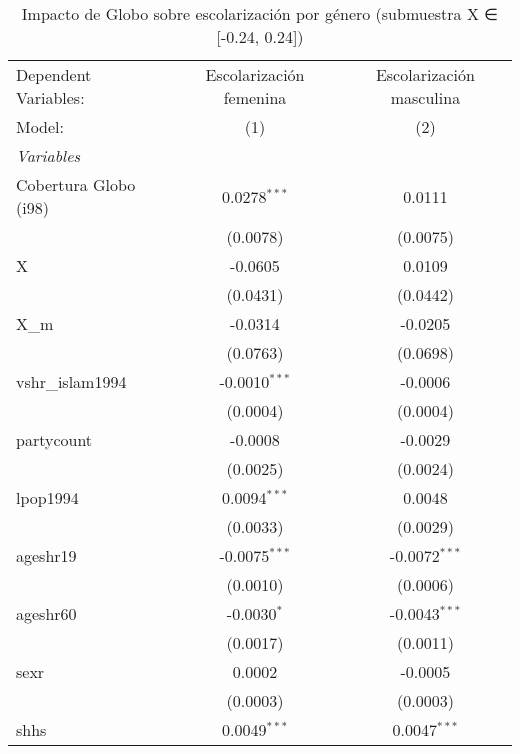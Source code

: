 \begin{table}[htbp]
   \caption{Impacto de Globo sobre escolarización por género (submuestra X ∈ [-0.24, 0.24])}
   \centering
   \begin{tabular}{lcc}
      \tabularnewline \midrule \midrule
      Dependent Variables:  & Escolarización femenina & Escolarización masculina\\  
      Model:                & (1)                     & (2)\\  
      \midrule
      \emph{Variables}\\
      Cobertura Globo (i98) & 0.0278$^{***}$          & 0.0111\\   
                            & (0.0078)                & (0.0075)\\   
      X                     & -0.0605                 & 0.0109\\   
                            & (0.0431)                & (0.0442)\\   
      X\_m                  & -0.0314                 & -0.0205\\   
                            & (0.0763)                & (0.0698)\\   
      vshr\_islam1994       & -0.0010$^{***}$         & -0.0006\\   
                            & (0.0004)                & (0.0004)\\   
      partycount            & -0.0008                 & -0.0029\\   
                            & (0.0025)                & (0.0024)\\   
      lpop1994              & 0.0094$^{***}$          & 0.0048\\   
                            & (0.0033)                & (0.0029)\\   
      ageshr19              & -0.0075$^{***}$         & -0.0072$^{***}$\\   
                            & (0.0010)                & (0.0006)\\   
      ageshr60              & -0.0030$^{*}$           & -0.0043$^{***}$\\   
                            & (0.0017)                & (0.0011)\\   
      sexr                  & 0.0002                  & -0.0005\\   
                            & (0.0003)                & (0.0003)\\   
      shhs                  & 0.0049$^{***}$          & 0.0047$^{***}$\\   

\end{tabular}
\end{table}
